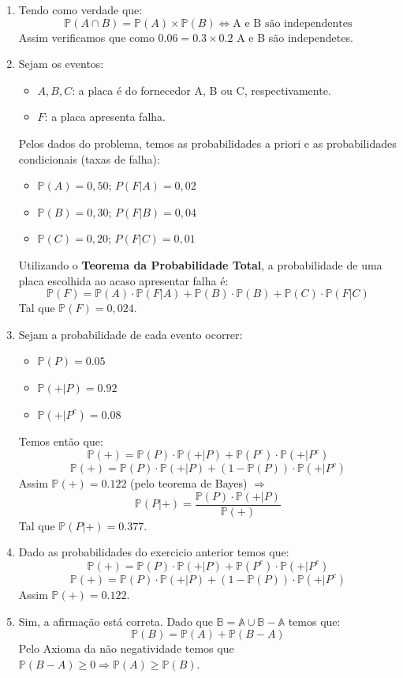 \documentclass[10pt, a4paper]{article}
\newcommand{\prob}{\mathbb{P}}
\begin{document}
\begin{enumerate}
    \item Tendo como verdade que:
    $$\prob(A \cap B) = \prob(A) \times \prob(B) \Longleftrightarrow \text{A e B são independentes}$$
    Assim verificamos que como $0.06 = 0.3 \times 0.2$ A e B são independetes.
    
    \item Sejam os eventos:
    \begin{itemize}
        \item $A, B, C$: a placa é do fornecedor A, B ou C, respectivamente.
        \item $F$: a placa apresenta falha.
    \end{itemize}

    Pelos dados do problema, temos as probabilidades a priori e as probabilidades condicionais (taxas de falha):
    \begin{itemize}
        \item $\prob(A) = 0,50$; $P(F|A) = 0,02$
        \item $\prob(B) = 0,30$; $P(F|B) = 0,04$
        \item $\prob(C) = 0,20$; $P(F|C) = 0,01$
    \end{itemize}

    Utilizando o \textbf{Teorema da Probabilidade Total}, a probabilidade de uma placa escolhida ao acaso apresentar falha é:
    $$\prob(F) = \prob(A) \cdot \prob(F|A) + \prob(B) \cdot \prob(B) + \prob(C) \cdot \prob(F|C)$$
    Tal que $\prob(F) = 0,024$.

    \item Sejam a probabilidade de cada evento ocorrer:
    \begin{itemize}
        \item $\prob(P) = 0.05$
        \item $\prob(+|P) = 0.92$
        \item $\prob(+|P^{c}) = 0.08$
    \end{itemize}
    Temos então que:
    $$\prob(+) =  \prob(P) \cdot \prob(+|P) + \prob(P^{c}) \cdot \prob(+|P^{c})$$
    $$\prob(+) =  \prob(P) \cdot \prob(+|P) + (1 - \prob(P)) \cdot \prob(+|P^{c})$$
    Assim $\prob(+) = 0.122$ (pelo teorema de Bayes) $\Longrightarrow$ 
    $$\prob(P|+) = \frac{\prob(P) \cdot \prob(+|P)}{\prob(+)}$$
    Tal que $\prob(P|+) = 0.377$.

    \item Dado as probabilidades do exercicio anterior temos que:
    $$\prob(+) =  \prob(P) \cdot \prob(+|P) + \prob(P^{c}) \cdot \prob(+|P^{c})$$
    $$\prob(+) =  \prob(P) \cdot \prob(+|P) + (1 - \prob(P)) \cdot \prob(+|P^{c})$$
    Assim $\prob(+) = 0.122$.

    \item Sim, a afirmação está correta. Dado que $\mathbb{B} = \mathbb{A} \cup \mathbb{B - A}$ temos que:
    $$\prob(B) = \prob(A) + \prob(B - A)$$
    Pelo Axioma da não negatividade temos que $\prob(B - A) \ge 0 \Longrightarrow \prob(A) \ge \prob(B)$.
\end{enumerate}
\end{document}

